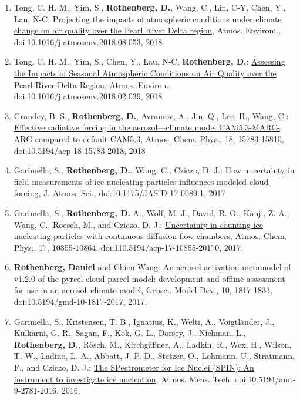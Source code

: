 \documentclass[11pt,letterpaper]{article}
\begin{document}
\begin{enumerate}[itemindent=-10pt]
 \item Tong, C. H. M., Yim, S., \textbf{Rothenberg, D.}, Wang, C., Lin, C-Y, Chen, Y., Lau, N-C: \href{https://doi.org/10.1016/j.atmosenv.2018.08.053}{Projecting the impacts of atmospheric conditions under climate change on air quality over the Pearl River Delta region}, Atmos. Envirom., doi:10.1016/j.atmosenv.2018.08.053, 2018

 \item Tong, C. H. M., Yim, S., Chen, Y., Lau, N-C, \textbf{Rothenberg, D.}: \href{https://doi.org/10.1016/j.atmosenv.2018.02.039}{Assessing the Impacts of Seasonal Atmospheric Conditions on Air Quality over the Pearl River Delta Region}, Atmos. Environ., doi:10.1016/j.atmosenv.2018.02.039, 2018

 \item Grandey, B. S., \textbf{Rothenberg, D.}, Avramov, A., Jin, Q., Lee, H., Wang, C.: \href{https://doi.org/10.5194/acp-18-15783-2018}{Effective radiative forcing in the aerosol—climate model CAM5.3-MARC-ARG compared to default CAM5.3}, Atmos. Chem. Phys., 18, 15783-15810, doi:10.5194/acp-18-15783-2018, 2018

 \item Garimella, S., \textbf{Rothenberg, D.}, Wang, C., Cziczo, D. J.: \href{http://dx.doi.org/10.1175/JAS-D-17-0089.1}{How uncertainty in field measurements of ice nucleating particles influences modeled cloud forcing}, J. Atmos. Sci., doi:10.1175/JAS-D-17-0089.1, 2017

 \item Garimella, S., \textbf{Rothenberg, D.} A., Wolf, M. J., David, R. O., Kanji, Z. A., Wang, C., Roesch, M., and Cziczo, D. J.: \href{https://doi.org/10.5194/acp-17-10855-2017}{Uncertainty in counting ice nucleating particles with continuous diffusion flow chambers}, Atmos. Chem. Phys., 17, 10855-10864, doi:110.5194/acp-17-10855-20170, 2017.

 \item \textbf{Rothenberg, Daniel} and Chien Wang:  \href{http://dx.doi.org/10.5194/gmd-10-1817-2017}{An aerosol activation metamodel of v1.2.0 of the pyrcel cloud parcel model: development and offline assessment for use in an aerosol–climate model}, Geosci. Model Dev., 10, 1817-1833, doi:10.5194/gmd-10-1817-2017, 2017.

 \item Garimella, S., Kristensen, T. B., Ignatius, K., Welti, A., Voigtländer, J., Kulkarni, G. R., Sagan, F., Kok, G. L., Dorsey, J., Nichman, L., \textbf{Rothenberg, D.}, Rösch, M., Kirchgäßner, A., Ladkin, R., Wex, H., Wilson, T. W., Ladino, L. A., Abbatt, J. P. D., Stetzer, O., Lohmann, U., Stratmann, F., and Cziczo, D. J.: \href{http://www.atmos-meas-tech.net/9/2781/2016/amt-9-2781-2016.html}{The SPectrometer for Ice Nuclei (SPIN): An instrument to investigate ice nucleation}, Atmos. Meas. Tech, doi:10.5194/amt-9-2781-2016, 2016.


\end{enumerate}
\end{document}
